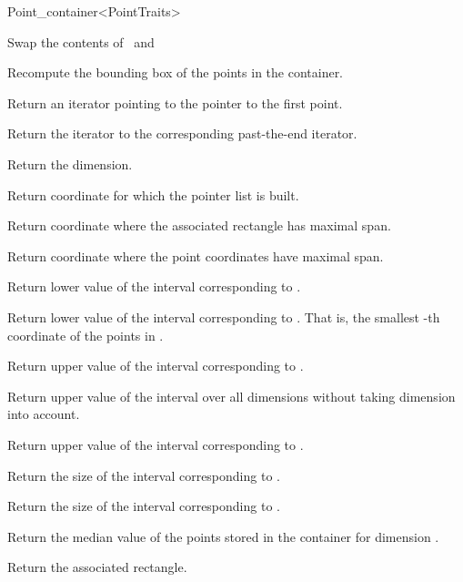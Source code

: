 \begin{ccRefClass}{Point_container<PointTraits>}
\begin{ccAdvanced}
{Swap the contents of \ccVar\ and }


{Recompute the bounding box of the points in the container.}


{
Return an iterator pointing to the pointer to the first point.
}

{
Return the iterator to the corresponding past-the-end iterator.
}

{
Return the dimension.
}

{
Return coordinate for which the pointer list is built.
}

{
Return coordinate where the associated rectangle has maximal span.
}

{
Return coordinate where the point coordinates have maximal span.
}

{
Return lower value of the interval corresponding to
.
}


{
Return lower value of the interval corresponding to
. That is, the smallest
-th coordinate of the points in
\ccVar.
}


{
Return upper value of the interval corresponding to
.
}

{
Return upper value of the interval over all dimensions
without taking dimension  into account.
}

{
Return upper value of the interval corresponding to
.
}

{
Return the size of the interval corresponding to .
}

{
Return the size of the interval corresponding to .
}

{
Return the median value of the points stored in the container for
dimension .
}

{Return the associated rectangle.}


\end{ccAdvanced}
\end{ccRefClass}
